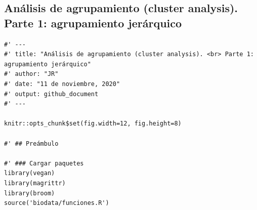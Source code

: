\documentclass[11pt,]{article}
\begin{document}
\subsection{Análisis de agrupamiento (cluster analysis). Parte 1:
agrupamiento
jerárquico}\label{anuxe1lisis-de-agrupamiento-cluster-analysis.-parte-1-agrupamiento-jeruxe1rquico}

\begin{verbatim}
#' ---
#' title: "Análisis de agrupamiento (cluster analysis). <br> Parte 1: agrupamiento jerárquico"
#' author: "JR"
#' date: "11 de noviembre, 2020"
#' output: github_document
#' ---

knitr::opts_chunk$set(fig.width=12, fig.height=8)

#' ## Preámbulo

#' ### Cargar paquetes
library(vegan)
library(magrittr)
library(broom)
source('biodata/funciones.R')


\end{verbatim}
\end{document}
